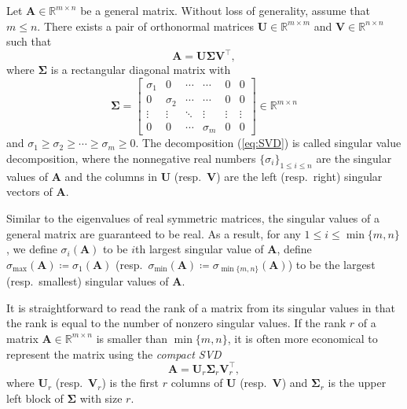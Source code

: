 \begin{definition}\label{def:SVD}Let
$\bm{A}\in\mathbb{R}^{m\times n}$ be a general matrix. Without loss
of generality, assume that $m\leq n$. There exists a pair of orthonormal
matrices $\bm{U}\in\mathbb{R}^{m\times m}$ and $\bm{V}\in\mathbb{R}^{n\times n}$
such that 
\begin{equation}\label{eq:SVD}
\bm{A}=\bm{U}\bm{\Sigma}\bm{V}^{\top},
\end{equation}
where $\bm{\Sigma}$ is a rectangular diagonal matrix with 
\[
\bm{\Sigma}=\left[\begin{array}{cccccc}
\sigma_{1} & 0 & \cdots & \cdots & 0 & 0\\
0 & \sigma_{2} & \cdots & \cdots & 0 & 0\\
\vdots & \vdots & \ddots & \vdots & \vdots & \vdots\\
0 & 0 & \cdots & \sigma_{m} & 0 & 0
\end{array}\right]\in\mathbb{R}^{m\times n}
\]
and $\sigma_{1}\geq\sigma_{2}\geq\cdots\geq\sigma_{m}\geq0$. The
decomposition (\ref{eq:SVD}) is called singular value decomposition,
where the nonnegative real numbers $\{\sigma_{i}\}_{1\leq i\leq n}$
are the singular values of $\bm{A}$ and the columns in $\bm{U}$
(resp.~$\bm{V}$) are the left (resp.~right) singular vectors of
$\bm{A}$. \end{definition}

Similar to the eigenvalues of real symmetric matrices, the singular
values of a general matrix are guaranteed to be real. As a result,
for any $1\leq i\leq\min\{m,n\}$, we define $\sigma_{i}(\bm{A})$
to be $i$th largest singular value of $\bm{A}$, define $\sigma_{\max}(\bm{A})\coloneqq\sigma_{1}(\bm{A})$
(resp.~$\sigma_{\min}(\bm{A})\coloneqq\sigma_{\min\{m,n\}}(\bm{A})$)
to be the largest (resp.~smallest) singular values of $\bm{A}$.

It is straightforward to read the rank of a matrix from its singular
values in that the rank is equal to the number of nonzero singular
values. If the rank $r$ of a matrix $\bm{A}\in\mathbb{R}^{m\times n}$
is smaller than $\min\{m,n\}$, it is often more economical to represent
the matrix using the \emph{compact SVD }
\begin{equation}
\bm{A}=\bm{U}_{r}\bm{\Sigma}_{r}\bm{V}_{r}^{\top},\label{eq:compact-SVD}
\end{equation}
where $\bm{U}_{r}$ (resp.~$\bm{V}_{r}$) is the first $r$ columns
of $\bm{U}$ (resp.~$\bm{V}$) and $\bm{\Sigma}_{r}$ is the upper
left block of $\bm{\Sigma}$ with size $r$.

